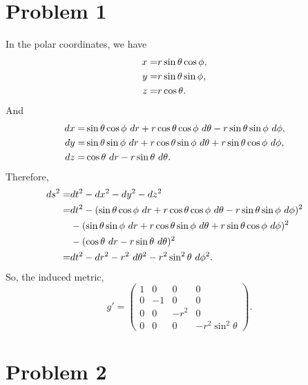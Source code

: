 \documentclass{article}
\begin{document}
\section*{Problem 1}
In the polar coordinates, we have 
\begin{align}
x =& r \sin \theta \cos \phi, \cr
y =& r \sin \theta \sin \phi, \cr
z =& r \cos \theta.
\end{align}
And 
\begin{align}
dx = & \sin \theta \cos \phi ~dr + r \cos \theta \cos \phi ~d\theta - r \sin \theta \sin \phi ~d\phi, \cr
dy = & \sin \theta \sin \phi ~dr + r \cos \theta \sin \phi ~d\theta+ r \sin \theta \cos \phi ~d\phi, \cr
dz = & \cos \theta ~dr - r \sin \theta ~d\theta.
\end{align}
Therefore,
\begin{align}
ds^2 =& dt^2 - dx^2 - dy^2 - dz^2\cr
=& dt^2 - (\sin \theta \cos \phi ~dr + r \cos \theta \cos \phi ~d\theta - r \sin \theta \sin \phi ~d\phi)^2\cr
&-(\sin \theta \sin \phi ~dr + r \cos \theta \sin \phi ~d\theta+ r \sin \theta \cos \phi ~d\phi)^2\cr
&-(\cos \theta ~dr - r \sin \theta ~d\theta)^2\cr
=& dt^2 - dr^2 - r^2~d\theta^2 - r^2 \sin^2\theta ~d\phi^2.
\end{align}
So, the induced metric,
\begin{equation}
g' = \begin{pmatrix}1 & 0 & 0 & 0\\ 0 & -1 & 0 & 0\\ 0 & 0 & -r^2 & 0\\ 0 & 0 & 0 & -r^2\sin^2\theta\end{pmatrix}.
\end{equation}


\section*{Problem 2}
\end{document}
